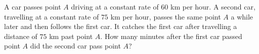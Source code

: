 A car passes point $A$ driving at a constant rate of $60$ km per hour. A second car, travelling at a constant rate of $75$ km per hour, passes the same point $A$ a while later and then follows the first car. It catches the first car after travelling a distance of $75$ km past point $A$. How many minutes after the first car passed point $A$ did the second car pass point $A$?
